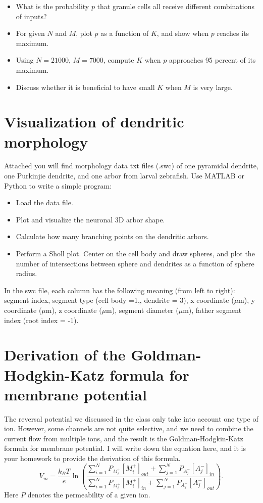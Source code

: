 \documentclass{article}
\begin{document}
\begin{itemize}
\item What is the probability $p$ that granule cells all receive different combinations of inputs?
\item For given $N$ and $M$, plot $p$ as a function of $K$, and show when $p$ reaches its maximum.
\item Using $N = 21000$, $M = 7000$, compute $K$ when $p$ approaches 95 percent of its maximum.
\item Discuss whether it is beneficial to have small $K$ when $M$ is very large.
\end{itemize}


\section*{Visualization of dendritic morphology}

Attached you will find morphology data txt files (.swc) of one pyramidal dendrite, one Purkinjie dendrite, and one arbor from larval zebrafish. Use MATLAB or Python to write a simple program: 
\begin{itemize}
\item Load the data file. 
\item Plot and visualize the neuronal 3D arbor shape. 
\item Calculate how many branching points on the dendritic arbors.
\item Perform a Sholl plot. Center on the cell body and draw spheres, and plot the number of intersections between sphere and dendrites as a function of sphere radius.  
\end{itemize}
In the swc file, each column has the following meaning (from left to right): segment index, segment type (cell body =1,, dendrite = 3), x coordinate ($\mu$m), y coordinate ($\mu$m), z coordinate ($\mu$m), segment diameter ($\mu$m), father segment index (root index = -1). 

\section*{Derivation of the Goldman-Hodgkin-Katz formula for membrane potential}

The reversal potential we discussed in the class only take into account one type of ion. However, some channels are not quite selective, and we need to combine the current flow from multiple ions, and the result is the Goldman-Hodgkin-Katz formula for membrane potential. I will write down the equation here, and it is your homework to provide the derivation of this formula.
\begin{equation} V_{m}=\frac{k_{B}T}{e}\ln\left(\frac{\sum_{i=1}^{N}P_{M_{i}^{+}}[M_{i}^{+}]_{out}+\sum_{j=1}^{N}P_{A_{j}^{-}}[A_{j}^{-}]_{in}}{\sum_{i=1}^{N}P_{M_{i}^{+}}[M_{i}^{+}]_{in}+\sum_{j=1}^{N}P_{A_{j}^{-}}[A_{j}^{-}]_{out}}\right).
\end{equation}
Here $P$ denotes the permeability of a given ion.
\end{document}
